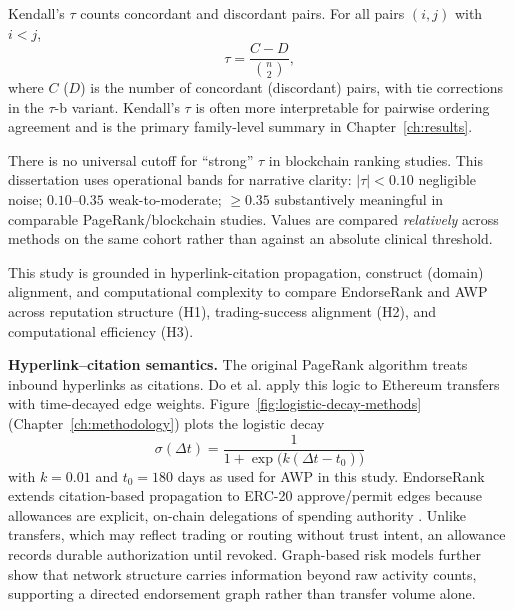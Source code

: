 Kendall's $\tau$  counts concordant and discordant pairs. For all pairs $(i,j)$ with $i<j$,
\begin{equation}
\tau = \frac{C - D}{\binom{n}{2}},
\label{eq:kendall}
\end{equation}
where $C$ ($D$) is the number of concordant (discordant) pairs, with tie corrections in the $\tau$-b variant. Kendall's $\tau$ is often more interpretable for pairwise ordering agreement and is the primary family-level summary in Chapter~\ref{ch:results}.


There is no universal cutoff for ``strong'' $\tau$ in blockchain ranking studies. This dissertation uses operational bands for narrative clarity: $|\tau|<0.10$ negligible noise; $0.10$--$0.35$ weak-to-moderate; $\geq 0.35$ substantively meaningful in comparable PageRank/blockchain studies. Values are compared \emph{relatively} across methods on the same cohort rather than against an absolute clinical threshold.


This study is grounded in hyperlink-citation propagation, construct (domain) alignment, and computational complexity to compare EndorseRank and AWP across reputation structure (H1), trading-success alignment (H2), and computational efficiency (H3).

\textbf{Hyperlink--citation semantics.} The original PageRank algorithm  treats inbound hyperlinks as citations. Do et al. apply this logic to Ethereum transfers with time-decayed edge weights. Figure~\ref{fig:logistic-decay-methods} (Chapter~\ref{ch:methodology}) plots the logistic decay
\begin{equation}
\sigma(\Delta t)=\frac{1}{1+\exp\bigl(k(\Delta t-t_0)\bigr)}
\label{eq:logistic}
\end{equation}
with $k=0.01$ and $t_0=180$ days as used for AWP in this study. EndorseRank extends citation-based propagation to ERC-20 approve/permit edges because allowances are explicit, on-chain delegations of spending authority . Unlike transfers, which may reflect trading or routing without trust intent, an allowance records durable authorization until revoked. Graph-based risk models  further show that network structure carries information beyond raw activity counts, supporting a directed endorsement graph rather than transfer volume alone.

